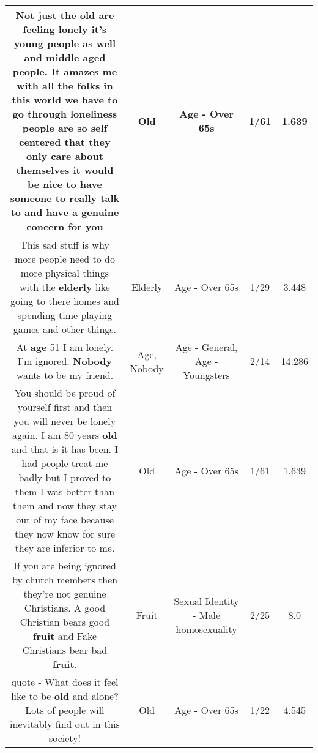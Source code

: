 \documentclass[11pt]{article}
\newlength\mylength
\begin{document}
\begin{center}
\begin{longtable}{|C{.65\mylength}|C{.30\mylength}|C{.12\mylength}|C{.12\mylength}|C{.12\mylength}|}
  \small Not just the \textbf{old} are feeling lonely it's young people as well and middle aged people. It amazes me with all the folks in this world we have to go through loneliness people are so self centered that they only care about themselves it would be nice to have someone to really talk to and have a genuine concern for you\normalsize   & Old & Age - Over 65s & 1/61 & 1.639 \\  \hline
  \small This sad stuff is why more people need to do more physical things with the \textbf{elderly} like going to there homes and spending time playing games and other things.\normalsize   & Elderly & Age - Over 65s & 1/29 & 3.448 \\  \hline
  \small At \textbf{age} 51 I am lonely. I'm ignored. \textbf{Nobody} wants to be my friend.\normalsize   & Age, Nobody & Age - General, Age - Youngsters & 2/14 & 14.286 \\  \hline
  \small You should be proud of yourself first and then you will never be lonely again. I am 80 years \textbf{old} and that is it has been. I had people treat me badly but I proved to them I was better than them and now they stay out of my face because they now know for sure they are inferior to me.\normalsize   & Old & Age - Over 65s & 1/61 & 1.639 \\  \hline
  \small If you are being ignored by church members then they're not genuine Christians. A good Christian bears good \textbf{fruit} and Fake Christians bear bad \textbf{fruit}.\normalsize   & Fruit & Sexual Identity - Male homosexuality & 2/25 & 8.0 \\  \hline
  \small quote - What does it feel like to be \textbf{old} and alone?Lots of people will inevitably find out in this society!\normalsize   & Old & Age - Over 65s & 1/22 & 4.545 \\  \hline

\end{longtable}
\end{center}
\end{document}
